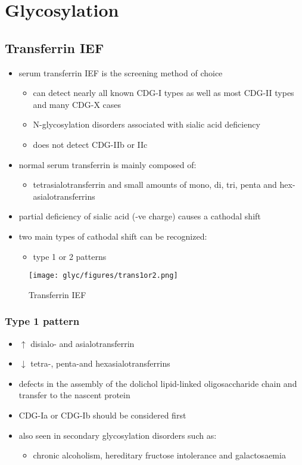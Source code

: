 \documentclass[12pt]{scrartcl}
\begin{document}
\section{Glycosylation}
\label{sec:orgf22342a}
\subsection{Transferrin IEF}
\label{sec:orgbc41f8b}
\begin{itemize}
\item serum transferrin IEF is the screening method of choice
\begin{itemize}
\item can detect nearly all known CDG-I types as well as most CDG-II types and many CDG-X cases
\item N-glycosylation disorders associated with sialic acid deficiency
\item does not detect CDG-IIb or IIc
\end{itemize}
\item normal serum transferrin is mainly composed of:
\begin{itemize}
\item tetrasialotransferrin and small amounts of mono, di, tri, penta
and hex-asialotransferrins
\end{itemize}
\item partial deficiency of sialic acid (-ve charge) causes a
cathodal shift
\item two main types of cathodal shift can be recognized:
\begin{itemize}
\item type 1 or 2 patterns
\end{itemize}
\end{itemize}

\begin{figure}[htbp]
\centering
\texttt{[image: glyc/figures/trans1or2.png]}
\caption{\label{fig:org72e452c}Transferrin IEF}
\end{figure}

\subsubsection{Type 1 pattern}
\label{sec:org810c3b4}
\begin{itemize}
\item \(\uparrow\) disialo- and asialotransferrin
\item \(\downarrow\)  tetra-, penta-and hexasialotransferrins
\item defects in the assembly of the dolichol lipid-linked
oligosaccharide chain and transfer to the nascent protein
\item CDG-Ia or CDG-Ib should be considered first
\item also seen in secondary glycosylation disorders such as:
\begin{itemize}
\item chronic alcoholism, hereditary fructose intolerance and galactosaemia
\end{itemize}
\end{itemize}
\end{document}
